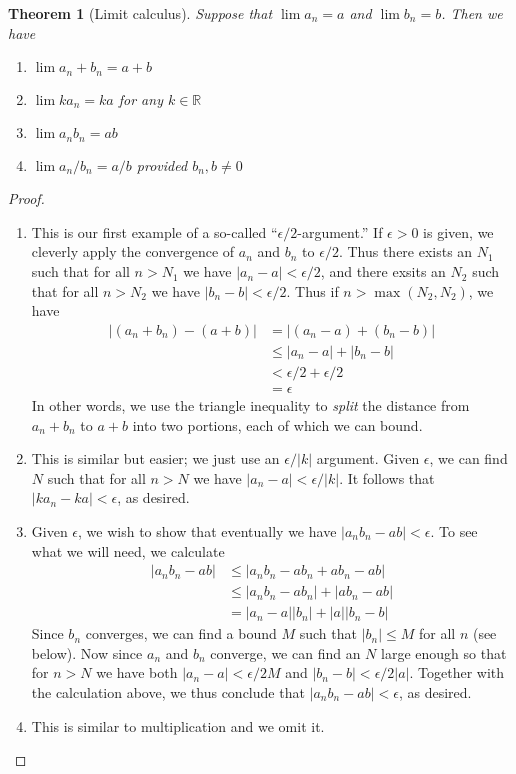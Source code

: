 \documentclass[11pt,oneside]{amsbook}
\newcommand{\RR}{\mathbb R}
\theoremstyle{definition}
\theoremstyle{plain}
\newtheorem{thm}{Theorem}[section]
\theoremstyle{definition}
\theoremstyle{remark}
\numberwithin{equation}{section}
\numberwithin{figure}{section}
\begin{document}
\begin{thm}[Limit calculus]
  Suppose that $\lim a_n=a$ and $\lim b_n=b$. Then we have
  \begin{enumerate}
  \item $\lim a_n+b_n=a+b$
  \item $\lim ka_n=ka$ for any $k\in\RR$
  \item $\lim a_nb_n=ab$
  \item $\lim a_n/b_n=a/b$ provided $b_n,b\neq 0$
  \end{enumerate}
\end{thm}

\begin{proof}
  \begin{enumerate}
  \item This is our first example of a so-called ``$\epsilon/2$-argument.'' If $\epsilon>0$ is given, we cleverly apply the convergence of $a_n$ and $b_n$ to $\epsilon/2$. Thus there exists an $N_1$ such that for all $n>N_1$ we have $|a_n-a|<\epsilon/2$, and there exsits an $N_2$ such that for all $n>N_2$ we have $|b_n-b|<\epsilon/2$. Thus if $n>\max(N_2,N_2)$, we have
    \begin{align*}
      |(a_n+b_n)-(a+b)|&=|(a_n-a)+(b_n-b)|\\
      &\leq|a_n-a|+|b_n-b|\\
      &<\epsilon/2+\epsilon/2\\
      &=\epsilon
    \end{align*}
    In other words, we use the triangle inequality to \emph{split} the distance from $a_n+b_n$ to $a+b$ into two portions, each of which we can bound.
  \item This is similar but easier; we just use an $\epsilon/|k|$ argument. Given $\epsilon$, we can find $N$ such that for all $n>N$ we have $|a_n-a|<\epsilon/|k|$. It follows that $|ka_n-ka|<\epsilon$, as desired.
  \item Given $\epsilon$, we wish to show that eventually we have $|a_nb_n-ab|<\epsilon$. To see what we will need, we calculate
    \begin{align*}
      |a_nb_n-ab|&\leq|a_nb_n-ab_n+ab_n-ab|\\
      &\leq|a_nb_n-ab_n|+|ab_n-ab|\\
      &=|a_n-a||b_n|+|a||b_n-b|
    \end{align*}
    Since $b_n$ converges, we can find a bound $M$ such that $|b_n|\leq M$ for all $n$ (see below). Now since $a_n$ and $b_n$ converge, we can find an $N$ large enough so that for $n>N$ we have both $|a_n-a|<\epsilon/2M$ and $|b_n-b|<\epsilon/2|a|$. Together with the calculation above, we thus conclude that $|a_nb_n-ab|<\epsilon$, as desired.
  \item This is similar to multiplication and we omit it.
  \end{enumerate}
\end{proof}
\end{document}
